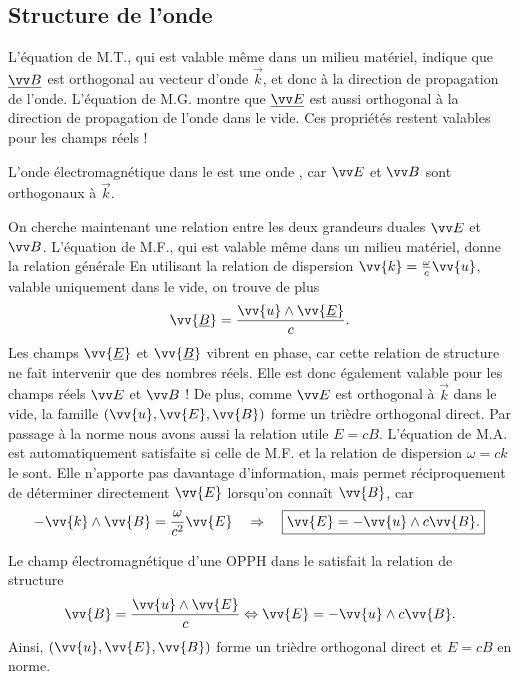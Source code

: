 \documentclass[12pt,fancy]{cours}
\begin{document}
\subsection{Structure de l'onde}

L'équation de M.T., qui est valable même dans un milieu matériel, indique que $\udl{\Vec{B}}$ est orthogonal au vecteur d'onde $\Vec{k}$, et donc à la direction de propagation de l'onde. L'équation de M.G. montre que $\udl{\Vec{E}}$ est aussi  orthogonal à la direction de propagation de l'onde dans le vide. Ces propriétés restent valables pour les champs réels !
\begin{prop}\label{prop:}
		L'onde électromagnétique dans le  est une onde , car $\E$ et $\B$ sont orthogonaux à $\Vec{k}$.
\end{prop}

 On cherche maintenant une relation entre les deux grandeurs duales $\E$ et $\B$. L'équation de M.F., qui est valable même dans un milieu matériel, donne la relation générale
En utilisant la relation de dispersion $\vv{k}=\frac{\omega}{c}\vv{u}$, valable uniquement dans le vide, on trouve de plus
  \begin{equation}
    \vv{\udl{B}} =\frac{\vv{u}\pv\vv{\udl{E}}}{c}.
  \end{equation}
  Les champs $\vv{\udl{E}}$ et $\vv{\udl{B}}$ vibrent en phase, car cette relation de structure ne fait intervenir que des nombres réels. Elle est donc également valable pour les champs réels $\E$ et $\B$ !
  De plus, comme $\E$ est orthogonal à $\Vec{k}$ dans le vide, la famille $(\vv{u},\vv{E},\vv{B})$ forme un trièdre orthogonal direct.
  Par passage à la norme nous avons aussi la relation utile
$E=cB.$
L'équation de M.A. est automatiquement satisfaite si celle de M.F. et la relation de dispersion $\omega=ck$ le sont. Elle n'apporte pas davantage d'information, mais permet réciproquement de déterminer directement $\vv{E}$ lorsqu'on connaît $\vv{B}$, car
\begin{equation}
-\vv{k}\pv\vv{B}=\frac{\omega}{c^2}\vv{E}\quad\Rightarrow\quad \boxed{\vv{E}=-\vv{u}\pv c\vv{B}.}
\end{equation}

\begin{prop}\label{prop:}
	Le champ électromagnétique d'une OPPH dans le  satisfait la relation de structure
$$
\vv{B}=\frac{\vv{u}\pv\vv{E}}{c} \Leftrightarrow \vv{E}=-\vv{u}\pv c\vv{B}.
$$
Ainsi, $(\vv{u},\vv{E},\vv{B})$ forme un trièdre orthogonal direct et $E=cB$ en norme.
\end{prop}
\end{document}
